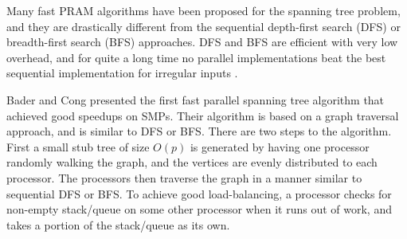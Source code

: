 Many fast PRAM algorithms have been proposed for the spanning tree problem, and they 
are drastically different from the sequential depth-first search (DFS) or breadth-first search (BFS) approaches.
DFS and BFS are efficient with very low overhead, and for quite a long time no parallel implementations beat the
best sequential implementation for irregular inputs \cite{BC04a}. 

Bader and Cong \cite{BC04a} presented the first fast parallel spanning tree algorithm that achieved good 
speedups on SMPs. Their algorithm is based on a graph traversal approach, and is similar to DFS or BFS. 
There are two steps to the algorithm. First a small stub tree of size $O(p)$ is generated by having one processor randomly walking the graph, and the vertices are evenly distributed to each processor.
The processors then traverse the graph in a manner similar to sequential DFS or BFS. 
To achieve good load-balancing, a processor checks for non-empty stack/queue on some other processor when it runs out of work, and takes a portion of the stack/queue as its own.

